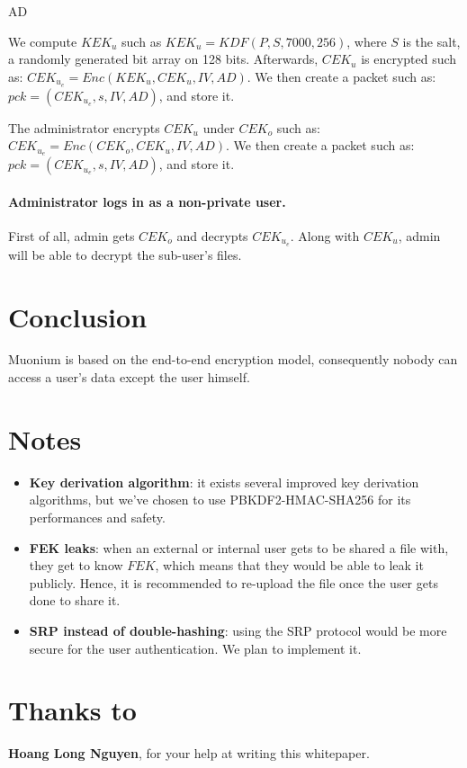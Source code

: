 AD\documentclass[a4paper,10pt]{article}
\begin{document}
We compute $KEK_u$ such as $KEK_u=KDF(P, S, 7000, 256)$, where $S$ is the salt,
a randomly generated bit array on 128 bits. Afterwards, $CEK_u$ is encrypted such as:
$CEK_u_e=Enc(KEK_u, CEK_u, IV, AD)$. We then create a packet such as:
$pck=(CEK_u_e, s, IV,AD)$, and store it.

The administrator encrypts $CEK_u$ under $CEK_o$ such as:
$CEK_u_e=Enc(CEK_o, CEK_u, IV,AD)$. We then create a packet such as:
$pck=(CEK_u_e, s, IV,AD)$, and store it.

\paragraph{Administrator logs in as a non-private user.}

First of all, admin gets $CEK_o$ and decrypts $CEK_u_e$. Along with $CEK_u$,
admin will be able to decrypt the sub-user's files.

\section{Conclusion}
Muonium is based on the end-to-end encryption model, consequently nobody can access a user's data except the user himself.

\section{Notes}

\begin{itemize}
	\item \textbf{Key derivation algorithm}: it exists several improved key derivation
	algorithms, but we've chosen to use PBKDF2-HMAC-SHA256 for its performances and safety.
	\item \textbf{FEK leaks}: when an external or internal user gets to be shared a file with,
	they get to know $FEK$, which means that they would be able to leak it publicly. Hence,
	it is recommended to re-upload the file once the user gets done to share it.
	\item \textbf{SRP instead of double-hashing}: using the SRP protocol would be more
	secure for the user authentication. We plan to implement it.
\end{itemize}


\section{Thanks to}

\textbf{Hoang Long Nguyen}, for your help at writing this whitepaper.


\end{document}
